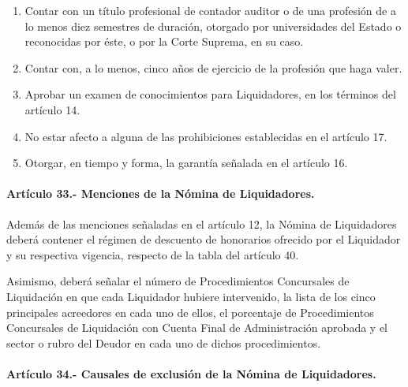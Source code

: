\documentclass[
]{book}
\begin{document}
\begin{enumerate}
\def\labelenumi{\arabic{enumi})}
\item
  Contar con un título profesional de contador auditor o de una profesión de a lo menos diez semestres de duración, otorgado por universidades del Estado o reconocidas por éste, o por la Corte Suprema, en su caso.
\item
  Contar con, a lo menos, cinco años de ejercicio de la profesión que haga valer.
\item
  Aprobar un examen de conocimientos para Liquidadores, en los términos del artículo 14.
\item
  No estar afecto a alguna de las prohibiciones establecidas en el artículo 17.
\item
  Otorgar, en tiempo y forma, la garantía señalada en el artículo 16.
\end{enumerate}

\hypertarget{artuxedculo-33.--menciones-de-la-nuxf3mina-de-liquidadores.}{%
\paragraph*{Artículo 33.- Menciones de la Nómina de Liquidadores.}\label{artuxedculo-33.--menciones-de-la-nuxf3mina-de-liquidadores.}}

Además de las menciones señaladas en el artículo 12, la Nómina de Liquidadores deberá contener el régimen de descuento de honorarios ofrecido por el Liquidador y su respectiva vigencia, respecto de la tabla del artículo 40.

Asimismo, deberá señalar el número de Procedimientos Concursales de Liquidación en que cada Liquidador hubiere intervenido, la lista de los cinco principales acreedores en cada uno de ellos, el porcentaje de Procedimientos Concursales de Liquidación con Cuenta Final de Administración aprobada y el sector o rubro del Deudor en cada uno de dichos procedimientos.

\hypertarget{artuxedculo-34.--causales-de-exclusiuxf3n-de-la-nuxf3mina-de-liquidadores.}{%
\paragraph*{Artículo 34.- Causales de exclusión de la Nómina de Liquidadores.}\label{artuxedculo-34.--causales-de-exclusiuxf3n-de-la-nuxf3mina-de-liquidadores.}}
\end{document}

